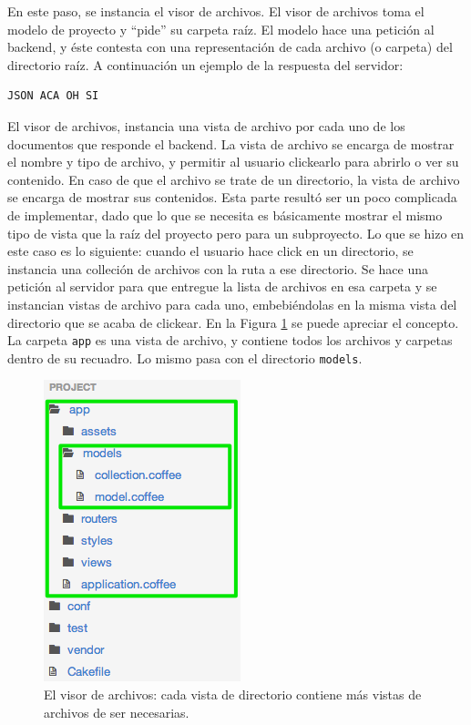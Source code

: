 \documentclass[12pt,titlepage,]{article}
\makeatletter
\def\maxwidth{\ifdim\Gin@nat@width>\linewidth\linewidth
\else\Gin@nat@width\fi}
\let\Oldincludegraphics\includegraphics
\renewcommand{\includegraphics}[1]{\Oldincludegraphics[width=\maxwidth]{#1}}
\makeatother
\begin{document}
En este paso, se instancia el visor de archivos. El visor de archivos
toma el modelo de proyecto y ``pide'' su carpeta raíz. El modelo hace
una petición al backend, y éste contesta con una representación de cada
archivo (o carpeta) del directorio raíz. A continuación un ejemplo de la
respuesta del servidor:

\begin{verbatim}
JSON ACA OH SI
\end{verbatim}

El visor de archivos, instancia una vista de archivo por cada uno de los
documentos que responde el backend. La vista de archivo se encarga de
mostrar el nombre y tipo de archivo, y permitir al usuario clickearlo
para abrirlo o ver su contenido. En caso de que el archivo se trate de
un directorio, la vista de archivo se encarga de mostrar sus contenidos.
Esta parte resultó ser un poco complicada de implementar, dado que lo
que se necesita es básicamente mostrar el mismo tipo de vista que la
raíz del proyecto pero para un subproyecto. Lo que se hizo en este caso
es lo siguiente: cuando el usuario hace click en un directorio, se
instancia una colleción de archivos con la ruta a ese directorio. Se
hace una petición al servidor para que entregue la lista de archivos en
esa carpeta y se instancian vistas de archivo para cada uno,
embebiéndolas en la misma vista del directorio que se acaba de clickear.
En la Figura \ref{figure:file-browser} se puede apreciar el concepto. La
carpeta \texttt{app} es una vista de archivo, y contiene todos los
archivos y carpetas dentro de su recuadro. Lo mismo pasa con el
directorio \texttt{models}.

\begin{figure}[htbp]
\centering
\includegraphics{figures/file-browser.png}
\caption{El visor de archivos: cada vista de directorio contiene más
vistas de archivos de ser necesarias. \label{figure:file-browser}}
\end{figure}
\end{document}
